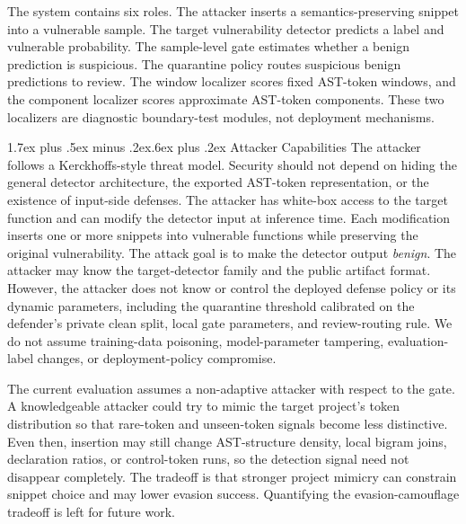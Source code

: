 \documentclass[letterpaper,twocolumn,10pt,twoside]{article}
\makeatletter
\renewcommand\subsection{\@startsection{subsection}{2}{\z@}%
  {1.7ex plus .5ex minus .2ex}{.6ex plus .2ex}%
  {\normalfont\normalsize\bfseries}}
\newcommand{\gate}{sample-level gate}
\makeatother
\begin{document}
The system contains six roles. The attacker inserts a semantics-preserving snippet into a vulnerable sample. The target vulnerability detector predicts a label and vulnerable probability. The \gate{} estimates whether a benign prediction is suspicious. The quarantine policy routes suspicious benign predictions to review. The window localizer scores fixed AST-token windows, and the component localizer scores approximate AST-token components. These two localizers are diagnostic boundary-test modules, not deployment mechanisms.

\subsection{Attacker Capabilities}
The attacker follows a Kerckhoffs-style threat model. Security should not depend on hiding the general detector architecture, the exported AST-token representation, or the existence of input-side defenses. The attacker has white-box access to the target function and can modify the detector input at inference time. Each modification inserts one or more snippets into vulnerable functions while preserving the original vulnerability. The attack goal is to make the detector output \textit{benign}. The attacker may know the target-detector family and the public artifact format. However, the attacker does not know or control the deployed defense policy or its dynamic parameters, including the quarantine threshold calibrated on the defender's private clean split, local gate parameters, and review-routing rule. We do not assume training-data poisoning, model-parameter tampering, evaluation-label changes, or deployment-policy compromise.

The current evaluation assumes a non-adaptive attacker with respect to the gate. A knowledgeable attacker could try to mimic the target project's token distribution so that rare-token and unseen-token signals become less distinctive. Even then, insertion may still change AST-structure density, local bigram joins, declaration ratios, or control-token runs, so the detection signal need not disappear completely. The tradeoff is that stronger project mimicry can constrain snippet choice and may lower evasion success. Quantifying the evasion-camouflage tradeoff is left for future work.
\end{document}
